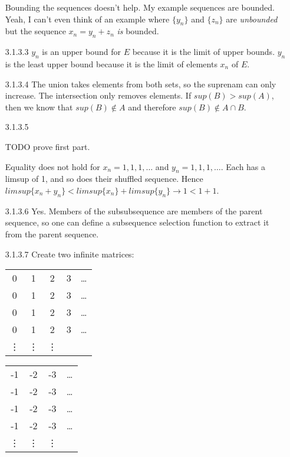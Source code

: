 \documentclass{article}
\begin{document}
\begin{enumerate}
  Bounding the sequences doesn't help. My example sequences are bounded. 
  Yeah, I can't even think of an example where $\{y_n\}$ and $\{z_n\}$ are
  \emph{unbounded} but the sequence $x_n = y_n + z_n$ \emph{is} bounded.
\item[]
\item[3.1.3.3]
  $y_n$ is an upper bound for $E$ because it is the limit of upper bounds. 
  $y_n$ is the least upper bound because it is the limit of elements $x_n$
        of $E$.
\item[]
\item[3.1.3.4]
  The union takes elements from both sets, so the suprenam can only increase. 
  The intersection only removes elements. If $sup(B) > sup(A)$, then we
  know that $sup(B) \not\in A$ and therefore $sup(B) \not\in A \cap B$.
\item[]
\item[3.1.3.5]

  TODO prove first part.

  Equality does not hold for $x_n = 1, 1, 1, \ldots$
  and $y_n = 1, 1, 1, \ldots$. 
  Each has a limsup of 1, and so does their shuffled sequence. 
  Hence $limsup\{ x_n + y_n \} < limsup\{ x_n \} + limsup\{ y_n \} \rightarrow
  1 < 1 + 1$.

\item[]
\item[3.1.3.6]
  Yes. 
  Members of the subsubsequence are members of the parent sequence,
  so one can define a subsequence selection function to extract it from
  the parent sequence. 
 \item[]
\item[3.1.3.7]
  Create two infinite matrices:
\item[]
  \begin{tabular}{ c c c c c}
   0 & 1 & 2 & 3 & \ldots \\
   0 & 1 & 2 & 3 & \ldots \\
   0 & 1 & 2 & 3 & \ldots \\
   0 & 1 & 2 & 3 & \ldots \\
   \vdots & \vdots & \vdots & \\
  \end{tabular}
  \begin{tabular}{ c c c c}
  -1 & -2 & -3 & \ldots \\
  -1 & -2 & -3 & \ldots \\
  -1 & -2 & -3 & \ldots \\
  -1 & -2 & -3 & \ldots \\
   \vdots & \vdots & \vdots & \\
  \end{tabular}


\end{enumerate}
\end{document}
